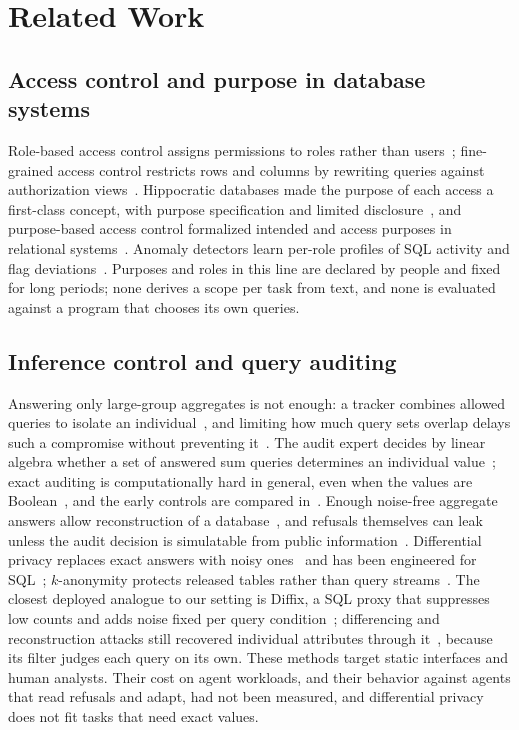 \documentclass[10pt,journal,compsoc]{IEEEtran}
\begin{document}
\section{Related Work}\label{sec:related}

\subsection{Access control and purpose in database systems}
Role-based access control assigns permissions to roles rather than users~\cite{sandhu1996rbac}; fine-grained access control restricts rows and columns by rewriting queries against authorization views~\cite{rizvi2004extending}. Hippocratic databases made the purpose of each access a first-class concept, with purpose specification and limited disclosure~\cite{agrawal2002hippocratic}, and purpose-based access control formalized intended and access purposes in relational systems~\cite{byun2008purpose}. Anomaly detectors learn per-role profiles of SQL activity and flag deviations~\cite{kamra2008detecting}. Purposes and roles in this line are declared by people and fixed for long periods; none derives a scope per task from text, and none is evaluated against a program that chooses its own queries.

\subsection{Inference control and query auditing}
Answering only large-group aggregates is not enough: a tracker combines allowed queries to isolate an individual~\cite{denning1979tracker}, and limiting how much query sets overlap delays such a compromise without preventing it~\cite{dobkin1979secure}. The audit expert decides by linear algebra whether a set of answered sum queries determines an individual value~\cite{chin1982auditing}; exact auditing is computationally hard in general, even when the values are Boolean~\cite{kleinberg2003boolean}, and the early controls are compared in~\cite{adam1989security}. Enough noise-free aggregate answers allow reconstruction of a database~\cite{dinur2003revealing}, and refusals themselves can leak unless the audit decision is simulatable from public information~\cite{kenthapadi2005simulatable}. Differential privacy replaces exact answers with noisy ones~\cite{dwork2006calibrating} and has been engineered for SQL~\cite{johnson2018flex}; $k$-anonymity protects released tables rather than query streams~\cite{sweeney2002kanonymity}. The closest deployed analogue to our setting is Diffix, a SQL proxy that suppresses low counts and adds noise fixed per query condition~\cite{francis2017diffix}; differencing and reconstruction attacks still recovered individual attributes through it~\cite{gadotti2019diffix,cohen2020reconstruction}, because its filter judges each query on its own. These methods target static interfaces and human analysts. Their cost on agent workloads, and their behavior against agents that read refusals and adapt, had not been measured, and differential privacy does not fit tasks that need exact values.
\end{document}
